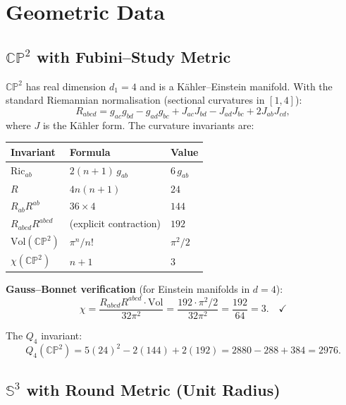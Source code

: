 \documentclass[11pt]{article}
\newcommand{\CP}{\mathbb{CP}}
\newcommand{\Sph}{\mathbb{S}}
\newcommand{\Ric}{\mathrm{Ric}}
\newcommand{\Vol}{\mathrm{Vol}}
\begin{document}
\section{Geometric Data}

\subsection{$\CP^2$ with Fubini--Study Metric}

$\CP^2$ has real dimension $d_1 = 4$ and is a K\"ahler--Einstein manifold.
With the standard Riemannian normalisation (sectional curvatures in $[1,4]$):
\begin{equation}
  R_{abcd} = g_{ac}g_{bd} - g_{ad}g_{bc}
  + J_{ac}J_{bd} - J_{ad}J_{bc} + 2J_{ab}J_{cd},
\end{equation}
where $J$ is the K\"ahler form. The curvature invariants are:
\begin{center}
\begin{tabular}{lll}
\toprule
Invariant & Formula & Value \\
\midrule
$\Ric_{ab}$ & $2(n{+}1)\,g_{ab}$ & $6\,g_{ab}$ \\
$R$ & $4n(n{+}1)$ & $24$ \\
$R_{ab}R^{ab}$ & $36 \times 4$ & $144$ \\
$R_{abcd}R^{abcd}$ & (explicit contraction) & $192$ \\
$\Vol(\CP^2)$ & $\pi^n/n!$ & $\pi^2/2$ \\
$\chi(\CP^2)$ & $n{+}1$ & $3$ \\
\bottomrule
\end{tabular}
\end{center}

\noindent\textbf{Gauss--Bonnet verification} (for Einstein manifolds in $d{=}4$):
\begin{equation}
  \chi = \frac{R_{abcd}R^{abcd} \cdot \Vol}{32\pi^2}
  = \frac{192 \cdot \pi^2/2}{32\pi^2} = \frac{192}{64} = 3. \quad\checkmark
\end{equation}

The $Q_4$ invariant:
\begin{equation}
  Q_4(\CP^2) = 5(24)^2 - 2(144) + 2(192) = 2880 - 288 + 384 = 2976.
\end{equation}

\subsection{$\Sph^3$ with Round Metric (Unit Radius)}
\end{document}
